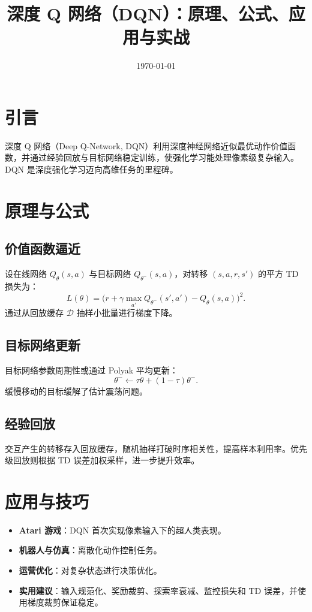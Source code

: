 \documentclass[UTF8,zihao=-4]{ctexart}
\title{深度 Q 网络（DQN）：原理、公式、应用与实战}
\author{}
\date{\today}
\begin{document}
\maketitle

\section{引言}
深度 Q 网络（Deep Q-Network, DQN）利用深度神经网络近似最优动作价值函数，并通过经验回放与目标网络稳定训练，使强化学习能处理像素级复杂输入。DQN 是深度强化学习迈向高维任务的里程碑。

\section{原理与公式}
\subsection{价值函数逼近}
设在线网络 \(Q_\theta(s,a)\) 与目标网络 \(Q_{\theta^-}(s,a)\)，对转移 \((s,a,r,s')\) 的平方 TD 损失为：
\begin{equation}
L(\theta) = \big( r + \gamma \max_{a'} Q_{\theta^-}(s',a') - Q_\theta(s,a) \big)^2.
\end{equation}
通过从回放缓存 \(\mathcal{D}\) 抽样小批量进行梯度下降。

\subsection{目标网络更新}
目标网络参数周期性或通过 Polyak 平均更新：
\begin{equation}
\theta^- \leftarrow \tau \theta + (1-\tau) \theta^-.
\end{equation}
缓慢移动的目标缓解了估计震荡问题。

\subsection{经验回放}
交互产生的转移存入回放缓存，随机抽样打破时序相关性，提高样本利用率。优先级回放则根据 TD 误差加权采样，进一步提升效率。

\section{应用与技巧}
\begin{itemize}
  \item \textbf{Atari 游戏}：DQN 首次实现像素输入下的超人类表现。
  \item \textbf{机器人与仿真}：离散化动作控制任务。
  \item \textbf{运营优化}：对复杂状态进行决策优化。
  \item \textbf{实用建议}：输入规范化、奖励裁剪、探索率衰减、监控损失和 TD 误差，并使用梯度裁剪保证稳定。
\end{itemize}
\end{document}
